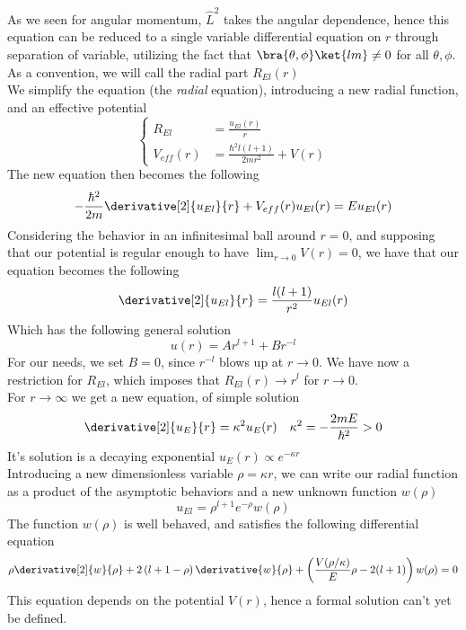 \documentclass[a4paper, 11pt]{book}
\newcommand{\1}{\opr{\mathds{1}}}
\newcommand{\opr}[1]{\hat{#1}}
\theoremstyle{plain}
\begin{document}
	As we seen for angular momentum, $\opr{L}^2$ takes the angular dependence, hence this equation can be reduced to a single variable differential equation on $r$ through separation of variable, utilizing the fact that $\bra{\theta,\phi}\ket{lm}\ne0$ for all $\theta,\phi$. As a convention, we will call the radial part $R_{El}(r)$\\
	We simplify the equation (the \textit{radial} equation), introducing a new radial function, and an effective potential
	\begin{equation}
		\left\{\begin{aligned}
			R_{El}&=\frac{u_{El}(r)}{r}\\
			V_{eff}(r)&=\frac{\hbar^2l(l+1)}{2mr^2}+V(r)
		\end{aligned}\right.
		\label{eq:substitutionsradeq}
	\end{equation}
	The new equation then becomes the following
	\begin{equation}
		-\frac{\hbar^2}{2m}\derivative[2]{u_{El}}{r}+V_{eff}(r)u_{El}(r)=Eu_{El}(r)
		\label{eq:newradeq}
	\end{equation}
	Considering the behavior in an infinitesimal ball around $r=0$, and supposing that our potential is regular enough to have $\lim_{r\to0}V(r)=0$, we have that our equation becomes the following
	\begin{equation}
		\derivative[2]{u_{El}}{r}=\frac{l(l+1)}{r^2}u_{El}(r)
		\label{eq:aroundr0behavior}
	\end{equation}
	Which has the following general solution
	\begin{equation*}
		u(r)=Ar^{l+1}+Br^{-l}
	\end{equation*}
	For our needs, we set $B=0$, since $r^{-l}$ blows up at $r\to0$. We have now a restriction for $R_{El}$, which imposes that $R_{El}(r)\to r^{l}$ for $r\to0$.\\
	For $r\to\infty$ we get a new equation, of simple solution
	\begin{equation}
		\derivative[2]{u_{E}}{r}=\kappa^2u_{E}(r)\quad\kappa^2=-\frac{2mE}{\hbar^2}>0
		\label{eq:rtoinftyradeq}
	\end{equation}
	It's solution is a decaying exponential $u_E(r)\propto e^{-\kappa r}$\\
	Introducing a new dimensionless variable $\rho=\kappa r$, we can write our radial function as a product of the asymptotic behaviors and a new unknown function $w(\rho)$
	\begin{equation*}
		u_{El}=\rho^{l+1}e^{-\rho}w(\rho)
	\end{equation*}
	The function $w(\rho)$ is well behaved, and satisfies the following differential equation
	\begin{equation}
		\rho\derivative[2]{w}{\rho}+2\left( l+1-\rho \right)\derivative{w}{\rho}+\left( \frac{V(\rho/\kappa)}{E}\rho-2(l+1) \right)w(\rho)=0
		\label{eq:wrhodiffeq}
	\end{equation}
	This equation depends on the potential $V(r)$, hence a formal solution can't yet be defined.
\end{document}
